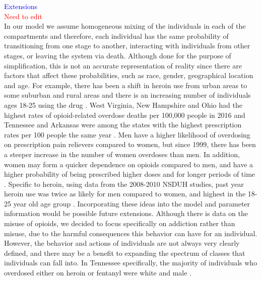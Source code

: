 \documentclass[12pt]{article}
\begin{document}
 \textcolor{blue}{Extensions}\\
 \textcolor{red}{Need to edit} \\
In our model we assume homogeneous mixing of the individuals in each of the compartments and therefore, each individual has the same probability of transitioning from one stage to another, interacting with individuals from other stages, or leaving the system via death. Although done for the purpose of simplification, this is not an accurate representation of reality since there are factors that affect these probabilities, such as race, gender, geographical location and age. For example, there has been a shift in heroin use from urban areas to some suburban and rural areas and there is an increasing number of individuals ages 18-25 using the drug \cite{NIDA2}. West Virginia, New Hampshire and Ohio had the highest rates of opioid-related overdose deaths per 100,000 people in 2016 and Tennessee and Arkansas were among the states with the highest prescription rates per 100 people the same year \cite{NIH3}. Men have a higher likelihood of overdosing on prescription pain relievers compared to women, but since 1999, there has been a steeper increase in the number of women overdoses than men. In addition, women may form a quicker dependence on opioids compared to men, and have a higher probability of being prescribed higher doses and for longer periods of time \cite{CDC5}. Specific to heroin, using data from the 2008-2010 NSDUH studies, past year heroin use was twice as likely for men compared to women, and highest in the 18-25 year old age group \cite{Jones}. Incorporating these ideas into the model and parameter information would be possible future extensions. Although there is data on the misuse of opioids, we decided to focus specifically on addiction rather than misuse, due to the harmful consequences this behavior can have for an individual. However, the behavior and actions of individuals are not always very clearly defined, and there may be a benefit to expanding the spectrum of classes that individuals can fall into. In Tennessee specifically, the majority of individuals who overdosed either on heroin or fentanyl were white and male \cite{PDO}. 
\pagebreak
\end{document}
